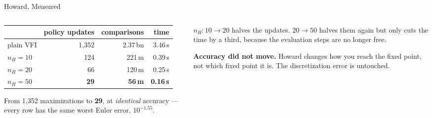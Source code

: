 \begin{frame}{Howard, Measured}
\begin{columns}[T]
\begin{column}{0.52\textwidth}
\begin{center}\footnotesize
\begin{tabularx}{\linewidth}{@{}>{\raggedright\arraybackslash}X r r r@{}}
\toprule
 & \textbf{policy updates} & \textbf{comparisons} & \textbf{time} \\
\midrule
plain VFI & 1{,}352 & 2.37\,bn & 3.46\,s \\
$n_H=10$ & 124 & 221\,m & 0.39\,s \\
$n_H=20$ & 66 & 120\,m & 0.25\,s \\
$n_H=50$ & \textbf{29} & \textbf{56\,m} & \textbf{0.16\,s} \\
\bottomrule
\end{tabularx}
\end{center}
\medskip
\small
From 1{,}352 maximizations to \textbf{29}, at \emph{identical} accuracy --- every row has the same worst Euler error, $10^{-1.55}$.
\end{column}
\begin{column}{0.45\textwidth}
\begin{takeawaybox}[title=\textbf{Diminishing returns}]\small
$n_H:10\to20$ halves the updates. $20\to50$ halves them again but only cuts the time by a third, because the evaluation steps are no longer free.
\end{takeawaybox}
\medskip
\begin{cautionbox}\footnotesize
\textbf{Accuracy did not move.} Howard changes how you reach the fixed point, not which fixed point it is. The discretization error is untouched.
\end{cautionbox}
\end{column}
\end{columns}
\vspace{1mm}
\end{frame}

